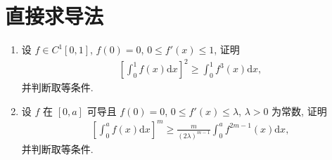 \documentclass[../../main.tex]{subfiles}%
\begin{document}
\section{直接求导法}

\begin{example}
\begin{enumerate}
\item 设 $f \in C^1[0,1]$, $f(0) = 0$, $0 \leqslant f'(x) \leqslant 1$, 证明
\begin{align*}
\left[\int_{0}^{1}f(x)\mathrm{d}x\right]^2 \geqslant \int_{0}^{1}f^3(x)\mathrm{d}x,
\end{align*}
并判断取等条件.

\item 设 $f$ 在 $[0,a]$ 可导且 $f(0) = 0$, $0 \leqslant f'(x) \leqslant \lambda$, $\lambda > 0$ 为常数, 证明
\begin{align}\label{equation-section03-16.24}
\left[\int_{0}^{a}f(x)\mathrm{d}x\right]^m \geqslant \frac{m}{(2\lambda)^{m - 1}}\int_{0}^{a}f^{2m - 1}(x)\mathrm{d}x,
\end{align}
并判断取等条件.
\end{enumerate}
\end{example}
\end{document}
